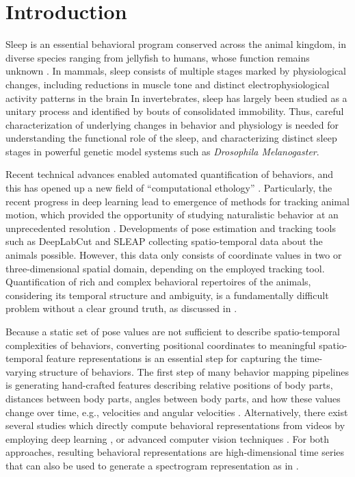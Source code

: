 \setlength{\parindent}{0pt}
\chapter{Introduction}\label{chapter:introduction}
Sleep is an essential behavioral program conserved across the animal kingdom, in diverse species ranging from jellyfish to humans, whose function remains unknown \citep{campbell_animal_1984, nath_jellyfish_2017}.
In mammals, sleep consists of multiple stages marked by physiological changes, including reductions in muscle tone and distinct electrophysiological activity patterns in the brain \citep{corner_sleep_1977, sauer_dynamics_2003} In invertebrates, sleep has largely been studied as a unitary process and identified by bouts of consolidated immobility.
Thus, careful characterization of underlying changes in behavior and physiology is needed for understanding the functional role of the sleep, and characterizing distinct sleep stages in powerful genetic model systems such as \textit{Drosophila Melanogaster}.

Recent technical advances enabled automated quantification of behaviors, and this has opened up a new field of ``computational ethology'' \citep{anderson_toward_2014, datta_computational_2019}.
Particularly, the recent progress in deep learning lead to emergence of  methods for tracking animal motion, which provided the opportunity of studying naturalistic behavior at an unprecedented resolution \citep{pereira_quantifying_2020}.
Developments of pose estimation and tracking tools such as DeepLabCut \citep{mathis_deeplabcut_2018} and SLEAP \citep{pereira_fast_2019, pereira_sleap_2022} collecting spatio-temporal data about the animals possible.
However, this data only consists of coordinate values in two or three-dimensional spatial domain, depending on the employed tracking tool.
Quantification of rich and complex behavioral repertoires of the animals, considering its temporal structure and ambiguity, is a fundamentally difficult problem without a clear ground truth, as discussed in \citet{pereira_quantifying_2020}.

Because a static set of pose values are not sufficient to describe spatio-temporal complexities of behaviors, converting positional coordinates to meaningful spatio-temporal feature representations is an essential step for capturing the time-varying structure of behaviors.
The first step of many behavior mapping pipelines is generating hand-crafted features describing relative positions of body parts, distances between body parts, angles between body parts, and how these values change over time, e.g., velocities and angular velocities \citep{kabra_jaaba_2013, hsu_b-soid_2021, marshall_continuous_2021, nilsson_simple_2020}.
Alternatively, there exist several studies which directly compute behavioral representations from videos by employing deep learning \citep{bohnslav_deepethogram_2021}, or advanced computer vision techniques \citep{berman_mapping_2014, wiltschko_mapping_2015}.
For both approaches, resulting behavioral representations are high-dimensional time series that can also be used to generate a spectrogram representation as in \citet{berman_mapping_2014, todd_systematic_2017, marshall_continuous_2021}.


